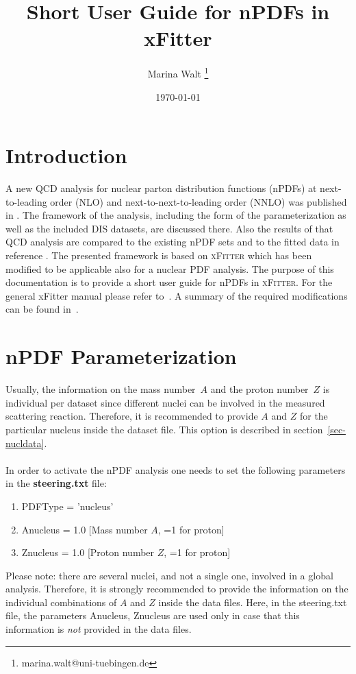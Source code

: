 \documentclass{article}
\title{Short User Guide for nPDFs in xFitter}
\author[1]{Marina Walt \thanks{marina.walt@uni-tuebingen.de}}
\affil[1]{Institute for Theoretical Physics, University of T\"ubingen, Auf der Morgenstelle 14, 72076 T\"ubingen, Germany}
\date{\today} %
\begin{document}
\maketitle
\tableofcontents


\section{Introduction}

A new QCD analysis for nuclear parton distribution functions (nPDFs) at next-to-leading order (NLO) and next-to-next-to-leading order (NNLO) was published in \cite{Walt:2019slu}. The framework of the analysis, including the form of the parameterization as well as the included DIS datasets, are discussed there. Also the results of that QCD analysis are compared to the existing nPDF sets and to the fitted data in reference \cite{Walt:2019slu}. The presented framework is based on \textsc{xFitter} \cite{Zenaiev:2016jnq,Bertone:2017tig} which has been modified to be applicable also for a nuclear PDF analysis. The purpose of this documentation is to provide a short user guide for nPDFs in \textsc{xFitter}. For the general xFitter manual please refer to~\cite{xfitter-manual}. A summary of the required modifications can be found in~\cite{Walt:2019slu}.

\clearpage
\section{nPDF Parameterization} 

Usually, the information on the mass number~$A$ and the proton number~$Z$ is individual per dataset since different nuclei can be involved in the measured scattering reaction. Therefore, it is recommended to provide $A$ and $Z$ for the particular nucleus inside the dataset file. This option is described in section~\ref{sec-nucldata}.\\ 
\\
In order to activate the nPDF analysis one needs to set the following parameters in the \textbf{steering.txt} file:
\begin{enumerate}
\item PDFType = 'nucleus'
\item Anucleus = 1.0 [Mass number $A$, =1 for proton]
\item Znucleus = 1.0 [Proton number $Z$, =1 for proton]
\end{enumerate}
\vskip 0.2in
\noindent Please note: there are several nuclei, and not a single one, involved in a global analysis. Therefore, it is strongly recommended to provide the information on the individual combinations of $A$ and $Z$ inside the data files. Here, in the steering.txt file, the parameters Anucleus, Znucleus are used only in case that this information is \textit{not} provided in the data files.
\end{document}
